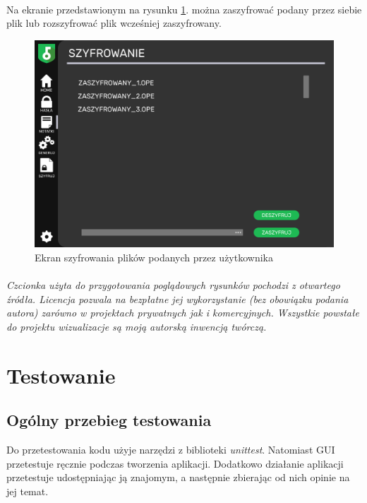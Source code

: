 \documentclass[a4paper]{article}
\begin{document}
\newpage

\paragraph{}Na ekranie przedstawionym na rysunku \ref{fig:szyfrowanie}. można zaszyfrować podany przez siebie plik lub rozszyfrować plik wcześniej zaszyfrowany.
\begin{figure}[H]
    \centering
    \includegraphics[width=1\textwidth]{img/ekran_szyfrowania.png}
    \caption{Ekran szyfrowania plików podanych przez użytkownika}
    \label{fig:szyfrowanie}
\end{figure}

\paragraph{}\textit{Czcionka użyta do przygotowania poglądowych rysunków pochodzi z otwartego źródła. Licencja pozwala na bezpłatne jej wykorzystanie (bez obowiązku podania autora) zarówno w projektach prywatnych jak i komercyjnych. Wszystkie powstałe do projektu wizualizacje są moją autorską inwencją twórczą.}

\section{Testowanie}
\subsection{Ogólny przebieg testowania}
Do przetestowania kodu użyje narzędzi z biblioteki \textit{unittest}. Natomiast GUI przetestuje ręcznie podczas tworzenia aplikacji. Dodatkowo działanie aplikacji przetestuje udostępniając ją znajomym, a następnie zbierając od nich opinie na jej temat.
\label{end}
\end{document}
